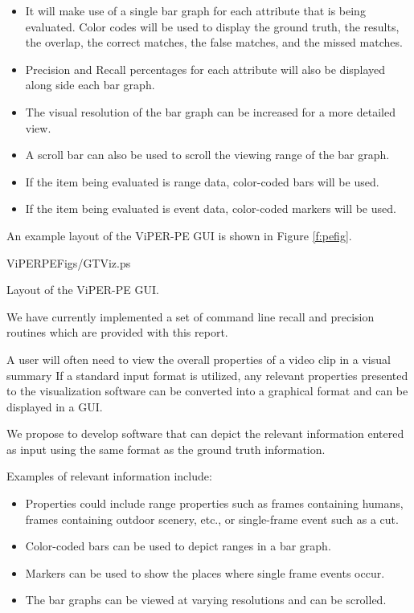 \begin{itemize}
\item It will make use of a single bar graph for each attribute that
is being evaluated. Color codes will be used to display the ground 
truth, the results, the overlap, the correct matches, the false 
matches, and the missed matches.

\item Precision and Recall percentages for each attribute will also be 
displayed along side each bar graph.

\item The visual resolution of the bar graph can be increased for a 
more detailed view. 

\item A scroll bar can also be used to scroll the viewing range of the bar 
graph.

\item If the item being evaluated is range data, color-coded bars
will be used.

\item If the item being evaluated is event data, color-coded markers
will be used.

\end{itemize}

An example layout of the ViPER-PE GUI is shown in Figure \ref{f:pefig}.
\begin{putfig}{ViPERPEFigs/GTViz.ps}
\caption{Layout of the ViPER-PE GUI.}
\label{f:pefig}
\end{putfig}



We have currently implemented a set of command line recall and precision
routines which are provided with this report.  

A user will often need to view the overall properties of a video clip in
a visual summary If a
standard input format is utilized, any relevant properties presented to the
visualization software can be converted into a graphical format and can be
displayed in a GUI.

We propose to develop software that can depict the relevant information
entered as input using the same format as the ground truth information.

Examples of relevant information include:
\begin{itemize}
\item Properties could include range properties such as frames containing
humans, frames containing outdoor scenery, etc., or 
single-frame event such as a cut. 

\item Color-coded bars can be used to depict ranges in a bar graph.

\item Markers can be used to show the places where single frame events occur.

\item The bar graphs can be viewed at varying resolutions and can be 
scrolled.
\end{itemize}

